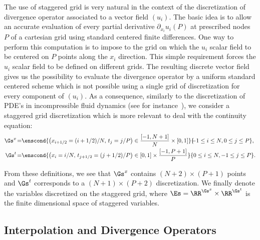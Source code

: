 The use of staggered grid is very natural in the context of the discretization of divergence operator associated to a vector field $(u_i)$. The basic idea is to allow an accurate evaluation of every partial derivative $\partial_{x_i} u_i(P)$ at prescribed nodes  $P$ of a cartesian grid  using standard centered finite differences. One way to perform this computation is to impose to the grid on which the $u_i$ scalar field to be centered on $P$ points along the $x_i$ direction. This simple requirement forces the $u_i$ scalar field to be defined on different grids. The resulting  discrete vector field gives us the possibility to evaluate the divergence operator by a uniform standard centered scheme which is not possible using a single grid of discretization for every component of $(u_i)$. As a consequence, similarly to the discretization of PDE's in incompressible fluid dynamics (see for instance~\cite{Harlow1965}), we consider a staggered grid discretization which is more relevant to deal with the continuity equation:
\begin{align*}
	\Gs^x \hspace{-0.05cm}&=\hspace{-0.1cm} \enscond{ \left(x_{i+1/2}=(i+1/2)/N ,\, t_j=j/P\right) \in \frac{[-1,N+1]}{N}\times[0,1]} {\hspace{-0.15cm}-1 \leq i \leq  N, 0 \leq j \leq  P },\\
	\Gs^t \hspace{-0.05cm}&=\hspace{-0.1cm} \enscond{ \left(x_i=i/N,\, t_{j+1/2}=(j+1/2)/P\right) \in [0,1]\times\frac{[-1,P+1]}{P}}{ 0 \leq i \leq  N, -1 \leq j \leq  P }.
\end{align*}

From these definitions, we see that $\Gs^x$ contains $(N+2)\times(P+1)$ points and $\Gs^t$ corresponds to a $(N+1)\times(P+2)$ discretization. We finally denote 
the variables discretized on the staggered grid, where $\Es = \RR^{\Gs^x} \times \RR^{\Gs^t}$ is the finite dimensional space of staggered variables. 


\subsection{Interpolation  and Divergence Operators}

